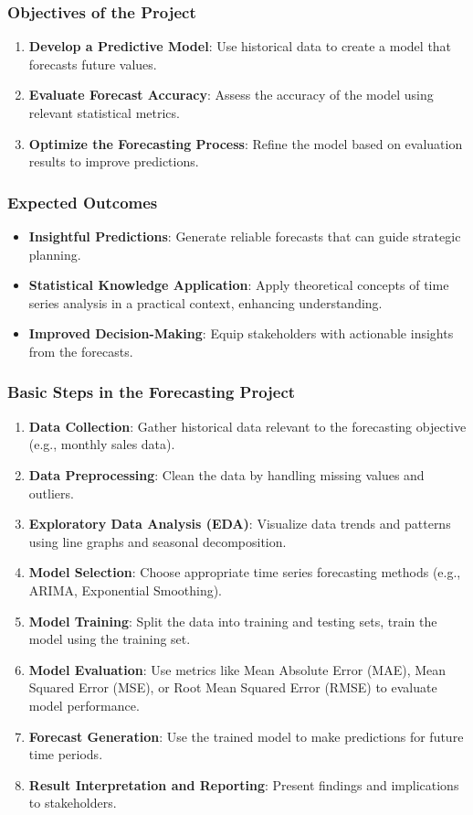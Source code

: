 \documentclass[aspectratio=169]{beamer}
\begin{document}
\begin{frame}[fragile]
    \frametitle{Objectives of the Project}
    \begin{enumerate}
        \item \textbf{Develop a Predictive Model}: Use historical data to create a model that forecasts future values.
        \item \textbf{Evaluate Forecast Accuracy}: Assess the accuracy of the model using relevant statistical metrics.
        \item \textbf{Optimize the Forecasting Process}: Refine the model based on evaluation results to improve predictions.
    \end{enumerate}
\end{frame}

\begin{frame}[fragile]
    \frametitle{Expected Outcomes}
    \begin{itemize}
        \item \textbf{Insightful Predictions}: Generate reliable forecasts that can guide strategic planning.
        \item \textbf{Statistical Knowledge Application}: Apply theoretical concepts of time series analysis in a practical context, enhancing understanding.
        \item \textbf{Improved Decision-Making}: Equip stakeholders with actionable insights from the forecasts.
    \end{itemize}
\end{frame}

\begin{frame}[fragile]
    \frametitle{Basic Steps in the Forecasting Project}
    \begin{enumerate}
        \item \textbf{Data Collection}: Gather historical data relevant to the forecasting objective (e.g., monthly sales data).
        \item \textbf{Data Preprocessing}: Clean the data by handling missing values and outliers.
        \item \textbf{Exploratory Data Analysis (EDA)}: Visualize data trends and patterns using line graphs and seasonal decomposition.
        \item \textbf{Model Selection}: Choose appropriate time series forecasting methods (e.g., ARIMA, Exponential Smoothing).
        \item \textbf{Model Training}: Split the data into training and testing sets, train the model using the training set.
        \item \textbf{Model Evaluation}: Use metrics like Mean Absolute Error (MAE), Mean Squared Error (MSE), or Root Mean Squared Error (RMSE) to evaluate model performance.
        \item \textbf{Forecast Generation}: Use the trained model to make predictions for future time periods.
        \item \textbf{Result Interpretation and Reporting}: Present findings and implications to stakeholders.
    \end{enumerate}
\end{frame}
\end{document}
